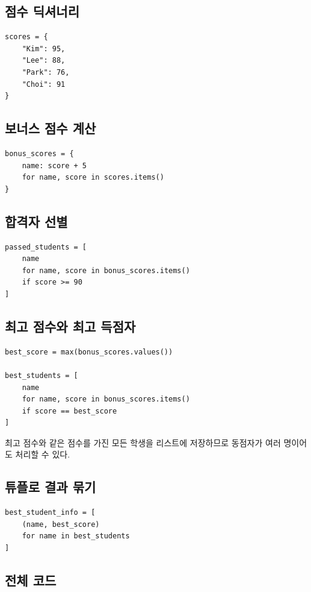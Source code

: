 \documentclass[11pt,a4paper]{article}
\begin{document}
\subsection{점수 딕셔너리}

\begin{lstlisting}
scores = {
    "Kim": 95,
    "Lee": 88,
    "Park": 76,
    "Choi": 91
}
\end{lstlisting}

\subsection{보너스 점수 계산}

\begin{lstlisting}
bonus_scores = {
    name: score + 5
    for name, score in scores.items()
}
\end{lstlisting}

\subsection{합격자 선별}

\begin{lstlisting}
passed_students = [
    name
    for name, score in bonus_scores.items()
    if score >= 90
]
\end{lstlisting}

\subsection{최고 점수와 최고 득점자}

\begin{lstlisting}
best_score = max(bonus_scores.values())

best_students = [
    name
    for name, score in bonus_scores.items()
    if score == best_score
]
\end{lstlisting}

최고 점수와 같은 점수를 가진 모든 학생을 리스트에 저장하므로 동점자가 여러 명이어도 처리할 수 있다.

\subsection{튜플로 결과 묶기}

\begin{lstlisting}
best_student_info = [
    (name, best_score)
    for name in best_students
]
\end{lstlisting}

\subsection{전체 코드}
\end{document}
